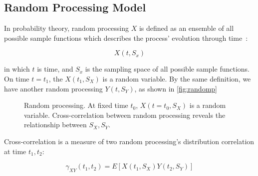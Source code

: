 \documentclass[final]{cvpr}
\begin{document}
\subsection{Random Processing Model}
\label{sec:rp}

In probability theory, random processing $X$ is defined as an ensemble of all possible sample functions which describes the process' evolution through time~\cite{proakis2001digital}:

\begin{equation}
    X(t, S_x)
\end{equation}

in which $t$ is time, and $S_x$ is the sampling space of all possible sample functions. On time $t=t_1$, the $X(t_1, S_X)$ is a random variable. By the same definition, we have another random processing $Y(t,S_Y)$, as shown in \autoref{fig:randomp}

\begin{figure}[ht]
\begin{center}
\end{center}
   \caption{Random processing. At fixed time $t_0$, $X(t=t_0,S_X)$ is a random variable. Cross-correlation between random processing reveals the relationship between $S_X, S_Y$.
   }
\label{fig:randomp}
\end{figure}

Cross-correlation is a measure of two random processing's distribution correlation at time $t_1, t_2$:

\begin{equation}
    \gamma_{XY}(t_1,t_2)=E\left[X(t_1, S_X)Y(t_2, S_Y)\right]
\end{equation}
\end{document}
